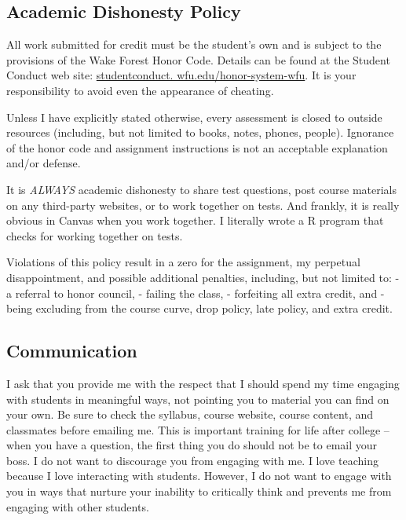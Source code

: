 \documentclass[11pt,]{article}
\begin{document}
\hypertarget{academic-dishonesty-policy}{%
\subsection{Academic Dishonesty
Policy}\label{academic-dishonesty-policy}}

All work submitted for credit must be the student's own and is subject
to the provisions of the Wake Forest Honor Code. Details can be found at
the Student Conduct web site:
\href{https://studentconduct.wfu.edu/honor-system-wfu/}{studentconduct.
wfu.edu/honor-system-wfu}. It is your responsibility to avoid even the
appearance of cheating.

Unless I have explicitly stated otherwise, every assessment is closed to
outside resources (including, but not limited to books, notes, phones,
people). Ignorance of the honor code and assignment instructions is not
an acceptable explanation and/or defense.

It is \emph{ALWAYS} academic dishonesty to share test questions, post
course materials on any third-party websites, or to work together on
tests. And frankly, it is really obvious in Canvas when you work
together. I literally wrote a R program that checks for working together
on tests.

Violations of this policy result in a zero for the assignment, my
perpetual disappointment, and possible additional penalties, including,
but not limited to: - a referral to honor council, - failing the class,
- forfeiting all extra credit, and - being excluding from the course
curve, drop policy, late policy, and extra credit.

\hypertarget{communication}{%
\subsection{Communication}\label{communication}}

I ask that you provide me with the respect that I should spend my time
engaging with students in meaningful ways, not pointing you to material
you can find on your own. Be sure to check the syllabus, course website,
course content, and classmates before emailing me. This is important
training for life after college -- when you have a question, the first
thing you do should not be to email your boss. I do not want to
discourage you from engaging with me. I love teaching because I love
interacting with students. However, I do not want to engage with you in
ways that nurture your inability to critically think and prevents me
from engaging with other students.
\end{document}
